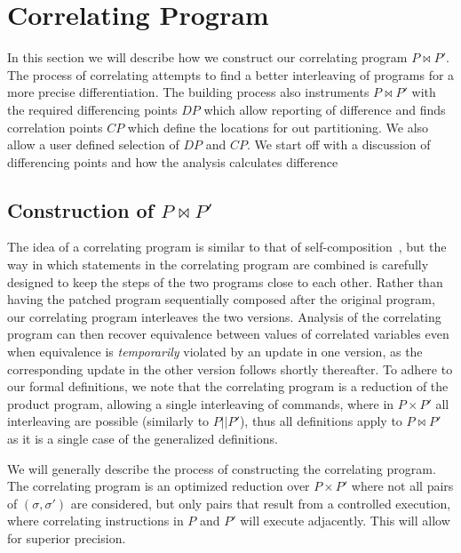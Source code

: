 \section{Correlating Program} 

In this section we will describe how we construct our correlating program $P \bowtie P'$. The process of correlating attempts to find a better interleaving of programs for a more precise differentiation. The building process also instruments $P \bowtie P'$ with the required differencing points $DP$ which allow reporting of difference and finds correlation points $CP$ which define the locations for out partitioning. We also allow a user defined selection of $DP$ and $CP$. We start off with a discussion of differencing points and how the analysis calculates difference

\subsection{Construction of $P \bowtie P'$ }
The idea of a correlating program is similar to that of
self-composition~\cite{BartheDArgenioRezk04,AikenTerauchi05}, but the way in
which statements in the correlating program are combined is carefully designed to
keep the steps of the two programs close to each other. Rather than having
the patched program sequentially composed after the original program, our
correlating program interleaves the two versions. Analysis of the correlating program can then recover equivalence between values of correlated variables even when
equivalence is \emph{temporarily} violated by an update in one version, as
the corresponding update in the other version follows shortly thereafter. To adhere to our formal definitions, we note that the correlating program is a reduction of the product program, allowing a single interleaving of commands, where in $P \times P'$ all interleaving are possible (similarly to $P||P'$), thus all definitions apply to $P \bowtie P'$ as it is a single case of the generalized definitions.

We will generally describe the process of constructing the correlating program. The correlating program is an optimized reduction over $P \times P'$ where not all pairs of $(\sigma,\sigma')$ are considered, but only pairs that result from a controlled execution, where correlating instructions in $P$ and $P'$ will execute adjacently. This will allow for superior precision.

